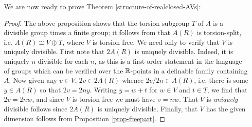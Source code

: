 We are now ready to prove Theorem \ref{structure-of-realclosed-AVs}:

\begin{proof}
The above proposition shows that the torsion subgroup $T$ of $A$ is a divisible group times a finite group; it follows from \cite[Theorem 8.1]{baer} that $A(R)$ is torsion-split, i.e. $A(R)\cong V\oplus T$, where $V$ is torsion free. We need only to verify that $V$ is uniquely divisible. First note that $2A(R)$ is uniquely divisible. Indeed, it is uniquely $n$-divisible for each $n$, as this is a first-order statement in the language of groups which can be verified over the $\mathbb{R}$-points in a definable family containing $A$. Now given any $v\in V$, $2v\in 2A(R)$ whence $2v/2n\in A(R)$, i.e. there is some $y\in A(R)$ so that $2v=2ny$. Writing $y=w+t$ for $w\in V$ and $t\in T$, we find that $2v=2nw$, and since $V$ is torsion-free we must have $v=nw$. That $V$ is \emph{uniquely} divisible follows since $2A(R)$ is uniquely divisible. Finally, that $V$ has the given dimension follows from Proposition \ref{prop-freepart}.
\end{proof}

